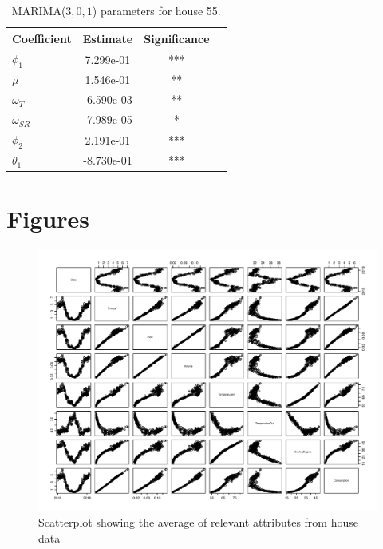     \begin{table}[]
        \centering
        \begin{tabular}{l|ccc}
        \hline
        Coefficient & Estimate & Significance\\ \hline \hline
        $\phi_1$ & 7.299e-01 & *** \\
        $\mu$ & 1.546e-01 & ** \\
        $\omega_{T}$ & -6.590e-03 & ** \\
        $\omega_{SR}$ & -7.989e-05 & * \\
        $\phi_2$ & 2.191e-01 &  *** \\
        $\theta_1$ & -8.730e-01 & *** \\
        \hline
        \end{tabular}
        \caption{MARIMA($3,0,1$) parameters for house 55.}
        \label{tab: MARIMAparam55}
     \end{table}
    

\chapter{Figures}
\begin{figure}
    \centering
    \includegraphics[width=1.3\textwidth, angle = 90 ]{../../../figures/house_attri.pdf}
    \caption{Scatterplot showing the average of relevant attributes from house data}
    \label{fig: house_attri}
\end{figure}

